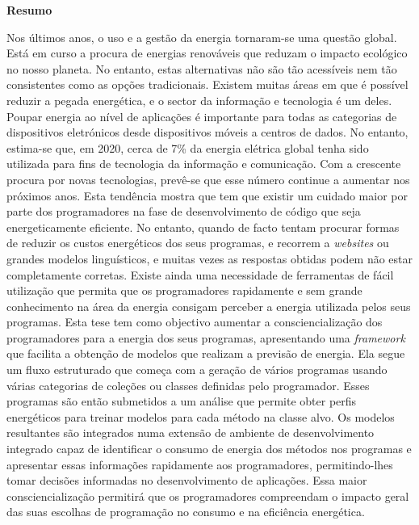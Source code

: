 \vspace*{2cm}
\begin{center}
\Large \bf Resumo
\end{center}
\vspace*{1cm} \setlength{\baselineskip}{0.6cm}

Nos últimos anos, o uso e a gestão da energia tornaram-se uma questão global. Está em curso a procura de energias renováveis que reduzam o impacto ecológico no nosso planeta. No entanto, estas alternativas não são tão acessíveis nem tão consistentes como as opções tradicionais. Existem muitas áreas em que é possível reduzir a pegada energética, e o sector da informação e tecnologia é um deles.
Poupar energia ao nível de aplicações é importante para todas as categorias de dispositivos eletrónicos desde dispositivos móveis a centros de dados. {\color{blue}No entanto, estima-se que, em 2020, cerca de 7\% da energia elétrica global tenha sido utilizada para fins de tecnologia da informação e comunicação. Com a crescente procura por novas tecnologias, prevê-se que esse número continue a aumentar nos próximos anos. }
Esta tendência mostra que tem que existir um cuidado maior por parte dos programadores na fase de desenvolvimento de código que seja energeticamente eficiente. No entanto, quando de facto tentam procurar formas de reduzir os custos energéticos dos seus programas, e recorrem a \textit{websites} ou grandes modelos linguísticos, e muitas vezes as respostas obtidas podem não estar completamente corretas. Existe ainda uma necessidade de ferramentas de fácil utilização que permita que os programadores rapidamente e sem grande conhecimento na área da energia consigam perceber a energia utilizada pelos seus programas.
Esta tese tem como objectivo aumentar a consciencialização dos programadores para a energia dos seus programas, apresentando uma \textit{framework} que facilita a obtenção de modelos que realizam a previsão de energia. Ela segue um fluxo estruturado que começa com a geração de vários programas usando várias categorias de coleções ou classes definidas pelo programador. Esses programas são então submetidos a um análise que permite obter perfis energéticos para treinar modelos para cada método na classe alvo.
Os modelos resultantes são integrados numa extensão de ambiente de desenvolvimento integrado capaz de identificar o consumo de energia dos métodos nos programas e apresentar essas informações rapidamente aos programadores, permitindo-lhes tomar decisões informadas no desenvolvimento de aplicações.
Essa maior consciencialização permitirá que os programadores compreendam o impacto geral das suas escolhas de programação no consumo e na eficiência energética.

